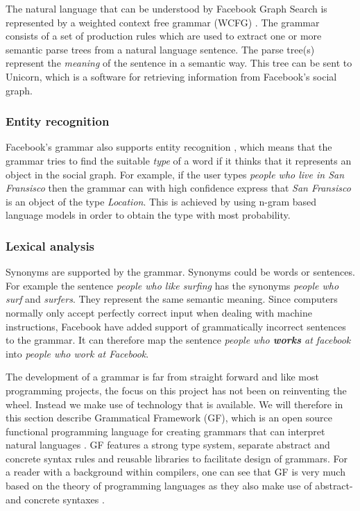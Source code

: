 The natural language that can be understood by Facebook Graph Search is represented by a weighted context free grammar (WCFG) \cite{li:2013}. The grammar consists of a set of production rules which are used to extract one or more semantic parse trees from a natural language sentence. The parse tree(s) represent the \emph{meaning} of the sentence in a semantic way. This tree can be sent to Unicorn, which is a software for retrieving information from Facebook's social graph. \cite{citation-needed}

\subsubsection{Entity recognition}
Facebook's grammar also supports entity recognition \cite{citation-needed}, which means that the grammar tries to find the suitable \emph{type} of a word if it thinks that it represents an object in the social graph. For example, if the user types \emph{people who live in San Fransisco} then the grammar can with high confidence express that \emph{San Fransisco} is an object of the type \emph{Location}. This is achieved by using n-gram based language models in order to obtain the type with most probability.

\subsubsection{Lexical analysis}
Synonyms are supported by the grammar. Synonyms could be words or sentences. For example the sentence \emph{people who like surfing} has the synonyms \emph{people who surf} and \emph{surfers}. They represent the same semantic meaning.
\newline
\newline
Since computers normally only accept perfectly correct input when dealing with machine instructions, Facebook have added support of grammatically incorrect sentences to the grammar. It can therefore map the sentence \emph{people who \textbf{works} at facebook} into \emph{people who work at Facebook}.

The development of a grammar is far from straight forward and like most programming projects, the focus on this project has not been on reinventing the wheel. Instead we make use of technology that is available. We will therefore in this section describe Grammatical Framework (GF), which is an open source functional programming language for creating grammars that can interpret natural languages \cite[p. 1]{ranta:2011}. GF features a strong type system, separate abstract and concrete syntax rules and reusable libraries to facilitate design of grammars. For a reader with a background within compilers, one can see that GF is very much based on the theory of programming languages as they also make use of abstract- and concrete syntaxes \cite[pp. 69-70]{Aho:1986:CPT:6448}.

